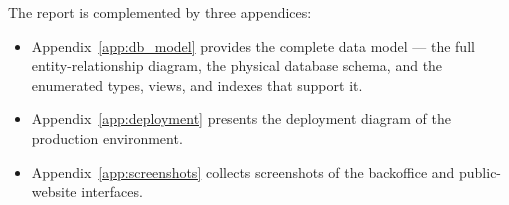 The report is complemented by three appendices:

\begin{itemize}
      \item Appendix~\ref{app:db_model} provides the complete data model --- the full entity-relationship diagram, the physical database schema, and the enumerated types, views, and indexes that support it.
      \item Appendix~\ref{app:deployment} presents the deployment diagram of the production environment.
      \item Appendix~\ref{app:screenshots} collects screenshots of the backoffice and public-website interfaces.
\end{itemize}
